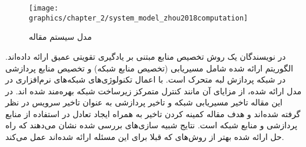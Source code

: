     \begin{figure}[h]
      \centerline{\texttt{[image: graphics/chapter\_2/system\_model\_zhou2018computation]}}
      \caption{مدل سیستم مقاله \cite{zhou2018computation}}
      \label{fig:chapter_2:system_model_zhou2018computation}
    \end{figure}

    در \cite{wang2019smart} نویسندگان یک روش تخصیص منابع مبتنی بر یادگیری تقویتی عمیق ارائه داده‌اند.
    الگوریتم ارائه شده شامل مسیریابی (تخصیص منابع شبکه) و تخصیص منابع پردازشی در شبکه پردازش لبه متحرک است.
    با اعمال تکنولوژی‌های شبکه‌های نرم‌افزاری در مدل ارائه شده، از مزایای آن مانند کنترل متمرکز زیرساخت شبکه بهره‌مند شده اند.
    در این مقاله تاخیر مسیریابی شبکه و تاخیر پردازشی به عنوان تاخیر سرویس در نظر گرفته شده‌اند و هدف مقاله کمینه کردن تاخیر به همراه ایجاد تعادل در استفاده از منابع پردازشی و منابع شبکه است.
    نتایج شبیه سازی‌های بررسی شده نشان می‌دهند که راه حل ارائه شده بهتر از روش‌های که قبلا برای این مسئله ارائه شده‌اند عمل می‌کند.
